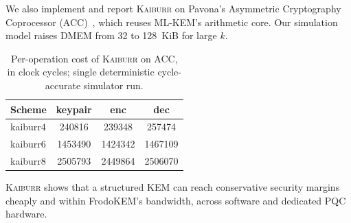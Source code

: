 \documentclass[journal=tches,preprint,floatrow]{iacrtrans}
\begin{document}
We also implement and report \textsc{Kaiburr} on Pavona's Asymmetric
Cryptography Coprocessor (ACC)~\cite{pavona}, which reuses ML-KEM's arithmetic core. Our simulation model raises DMEM from 32 to 128~KiB for large $k$.
\begin{table}[H]
  \centering
  \footnotesize
  \setlength{\tabcolsep}{6pt}
  \renewcommand{\arraystretch}{0.95}
\caption{Per-operation cost of \textsc{Kaiburr} on ACC, in clock cycles; single deterministic cycle-accurate simulator run.}\label{tab:kaiburr-acc}
  \begin{tabular}{@{}l
      S[table-format=7.0]
      S[table-format=7.0]
      S[table-format=7.0]@{}}
    \toprule
    Scheme & {keypair} & {enc} & {dec} \\
    \midrule
    kaiburr4 &  240816 &  239348 &  257474 \\
    kaiburr6 & 1453490 & 1424342 & 1467109 \\
    kaiburr8 & 2505793 & 2449864 & 2506070 \\
    \bottomrule
  \end{tabular}
\end{table}
\textsc{Kaiburr} shows that a structured KEM can reach conservative security margins cheaply and within FrodoKEM's bandwidth, across software and dedicated PQC hardware.
{\footnotesize


}
\end{document}
